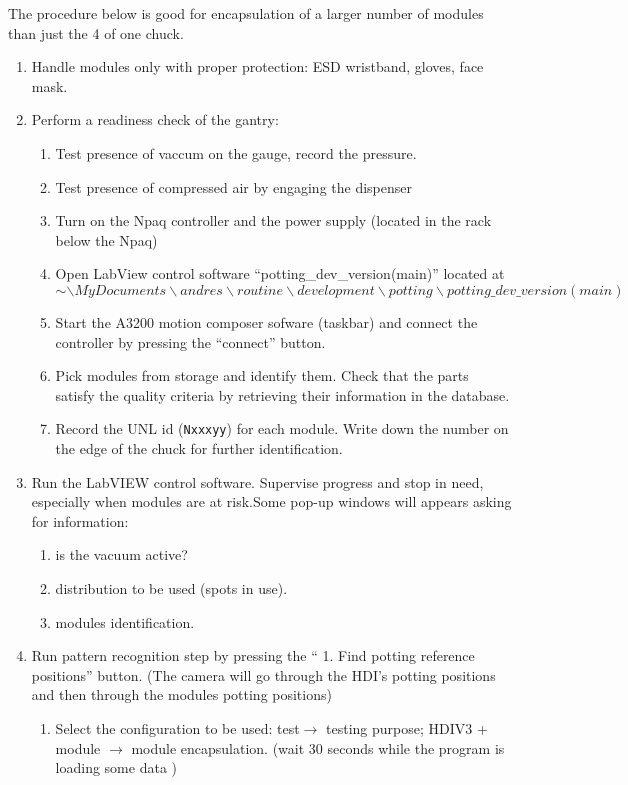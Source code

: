\documentclass[12pt]{unlsilabsop}
\begin{document}
The procedure below is good for encapsulation of a larger number of modules than just the 4 of one chuck.
\begin{enumerate}
    \item Handle modules only with proper protection: ESD wristband, gloves, face mask.
    \item Perform a readiness check of the gantry:
    \begin{enumerate}
	\item Test presence of vaccum on the gauge, record the pressure.
	\item Test presence of compressed air by engaging the dispenser
        \item Turn on the Npaq controller and the power supply (located in the rack below the Npaq)
        \item Open LabView control software ``potting\_dev\_version(main)'' located at $$ \sim\backslash MyDocuments\backslash andres\backslash routine\backslash development\backslash potting \backslash potting\_dev\_version(main)$$
        \item Start the A3200 motion composer sofware (taskbar) and connect the controller by pressing the ``connect'' button.
       \item Pick modules from storage and identify them. Check that the parts satisfy the quality criteria by retrieving their information in the database. \label{enum:startenacpulation}
    \item Record the UNL id (\texttt{Nxxxyy}) for each module. Write down the number on the edge of the chuck for further identification.
    \end{enumerate}
  \item Run the LabVIEW control software. Supervise progress and stop in need, especially when modules are at risk.Some pop-up windows will appears asking for information:
    \begin{enumerate}
    \item is the vacuum active?
    \item distribution to be used (spots in use).  
    \item modules identification.  
    \end{enumerate}
  \item Run pattern recognition step by pressing the `` 1. Find potting reference positions'' button. (The camera will go through the HDI's potting positions and then through the modules potting positions)
    \begin{enumerate}
    \item Select the configuration to be used: test$\to$ testing purpose; HDIV3 + module $\to$ module encapsulation. (wait 30 seconds while the program is loading some data ) 

\end{enumerate}
\end{enumerate}
\end{document}
